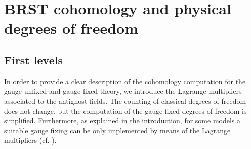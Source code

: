 \documentclass[a4paper,12pt]{article}
\begin{document}

\section{BRST cohomology and physical degrees of freedom}
\label{coho}

\subsection{First levels}
\label{first}

In order to provide a clear description of the cohomology computation
for the gauge unfixed and gauge fixed theory, we introduce the
Lagrange multipliers associated to the antighost fields.  The counting
of classical degrees of freedom does not change, but the computation
of the gauge-fixed degrees of freedom is simplified. Furthermore, as
explained in the introduction, for some models a suitable gauge fixing
can be only implemented by means of the Lagrange multipliers (cf.
\cite{porr_2}).
\end{document}
